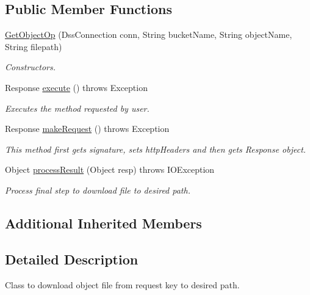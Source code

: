 \subsection*{Public Member Functions}
\begin{DoxyCompactItemize}
\item 
\hyperlink{classorg_1_1jcs_1_1dss_1_1op_1_1GetObjectOp_a3c6cbde6de75cd9b9c30fd3bdffdbbf5}{Get\+Object\+Op} (Dss\+Connection conn, String bucket\+Name, String object\+Name, String filepath)\hypertarget{classorg_1_1jcs_1_1dss_1_1op_1_1GetObjectOp_a3c6cbde6de75cd9b9c30fd3bdffdbbf5}{}\label{classorg_1_1jcs_1_1dss_1_1op_1_1GetObjectOp_a3c6cbde6de75cd9b9c30fd3bdffdbbf5}

\begin{DoxyCompactList}\small\item\em Constructors. \end{DoxyCompactList}\item 
Response \hyperlink{classorg_1_1jcs_1_1dss_1_1op_1_1GetObjectOp_a4fa98961dbe836640650a0eeaf1ae330}{execute} ()  throws Exception 
\begin{DoxyCompactList}\small\item\em Executes the method requested by user. \end{DoxyCompactList}\item 
Response \hyperlink{classorg_1_1jcs_1_1dss_1_1op_1_1GetObjectOp_a9323461b3d235ccdd505b09c97e6b796}{make\+Request} ()  throws Exception 
\begin{DoxyCompactList}\small\item\em This method first gets signature, sets http\+Headers and then gets Response object. \end{DoxyCompactList}\item 
Object \hyperlink{classorg_1_1jcs_1_1dss_1_1op_1_1GetObjectOp_a041a512683b6e12e3da821e680f5b805}{process\+Result} (Object resp)  throws I\+O\+Exception
\begin{DoxyCompactList}\small\item\em Process final step to download file to desired path. \end{DoxyCompactList}\end{DoxyCompactItemize}
\subsection*{Additional Inherited Members}


\subsection{Detailed Description}
Class to download object file from request key to desired path. 

